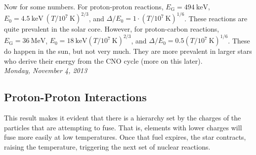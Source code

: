 \documentclass[10pt]{article}
\numberwithin{equation}{section}
\newcommand{\n}{\noindent}
\begin{document}
  \n Now for some numbers. For proton-proton reactions,
  $E_{\mathrm{G}}=494\ \mathrm{keV}$, $E_0=4.5\ \mathrm{keV}\
  \left(T/10^7\ \mathrm{K}\right)^{2/3}$, and $\Delta/E_0=1\cdot
  (T/10^7\ \mathrm{K})^{1/6}$. These reactions are quite prevalent in
  the solar core. However, for proton-carbon reactions,
  $E_\mathrm{G}=36\ \mathrm{MeV}$, $E_0=18\ \mathrm{keV}(T/10^7\
  \mathrm{K})^{2/3}$, and $\Delta/E_0=0.5(T/10^7\
  \mathrm{K})^{1/6}$. These do happen in the sun, but not very
  much. They are more prevalent in larger stars who derive their
  energy from the CNO cycle (more on this later).\\
  
  \n \textit{Monday, November 4, 2013}\\

  \subsection{Proton-Proton Interactions}
  \label{sec:prot-prot-inter}

  \n This result makes it evident that there is a hierarchy set by the
  charges of the particles that are attempting to fuse. That is,
  elements with lower charges will fuse more easily at low
  temperatures. Once that fuel expires, the star contracts, raising
  the temperature, triggering the next set of nuclear reactions.\\
\end{document}
